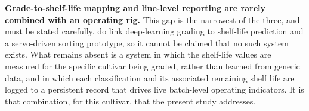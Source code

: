 \textbf{Grade-to-shelf-life mapping and line-level reporting are rarely combined with an operating rig.} This gap is the narrowest of the three, and must be stated carefully. \citet{geetha2025} do link deep-learning grading to shelf-life prediction and a servo-driven sorting prototype, so it cannot be claimed that no such system exists. What remains absent is a system in which the shelf-life values are measured for the specific cultivar being graded, rather than learned from generic data, and in which each classification and its associated remaining shelf life are logged to a persistent record that drives live batch-level operating indicators. It is that combination, for this cultivar, that the present study addresses.

\clearpage
